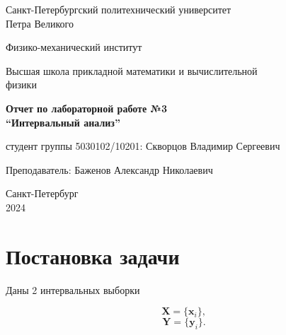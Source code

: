 \documentclass{article}
\begin{document}
  \begin{titlepage}
    \begin{center}
      Санкт-Петербургский политехнический университет \\Петра Великого
    \end{center}

    \begin{center}
      Физико-механический институт
    \end{center}

    \begin{center}
      Высшая школа прикладной математики и вычислительной\\ физики
    \end{center}

    \vspace{8em}

    \begin{center}
      \textbf{Отчет по лабораторной работе №3}\\
      \textbf{“Интервальный анализ”}
    \end{center}

    \vspace{\fill}

    \begin{flushright}
       студент группы 5030102/10201:
      \hfill
      Скворцов Владимир Сергеевич \\
    \end{flushright}
    Преподаватель: \hfill Баженов Александр Николаевич

    \vspace{12em}

    \begin{center}
      Санкт-Петербург\\
      2024
    \end{center}
  \end{titlepage}

  \tableofcontents

  \newpage

  \section{Постановка задачи}

  Даны 2 интервальных выборки

  \begin{equation}
    \mathbf{X} = \{ \mathbf{x}_i \},
  \end{equation}
  \begin{equation}
    \mathbf{Y} = \{ \mathbf{y}_i \}.
  \end{equation}
\end{document}
